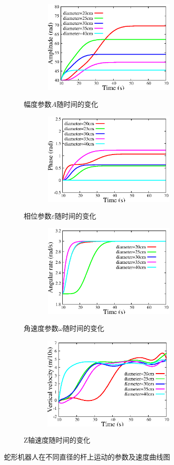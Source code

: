 \begin{figure}[htbp]
	\centering
	\begin{subfigure}{0.45\textwidth}{
		\centering
		\includegraphics[width=1\textwidth,height=130pt]{figure/chap05/samplifier.eps}
		\label{fig:samplifier}
		\caption{幅度参数$A$随时间的变化}
	}
	\end{subfigure}
	\begin{subfigure}{0.45\textwidth}{
		\centering
		\includegraphics[width=1\textwidth,height=130pt]{figure/chap05/sphase.eps}
		\label{fig:sphase}
		\caption{相位参数$\varepsilon$随时间的变化}
	}
	\end{subfigure}
	\begin{subfigure}{0.45\textwidth}{
		\centering
		\includegraphics[width=1\textwidth,height=130pt]{figure/chap05/sarate.eps}
		\label{fig:sarate}
		\caption{角速度参数$\omega$随时间的变化}
	}
	\end{subfigure}
	\begin{subfigure}{0.45\textwidth}{
		\centering
		\includegraphics[width=1\textwidth,height=130pt]{figure/chap05/svel.eps}
		\label{fig:svelocity}
		\caption{Z轴速度随时间的变化}
	}
	\end{subfigure}
	\caption{蛇形机器人在不同直径的杆上运动的参数及速度曲线图}
	\label{fig:scurve}
\end{figure}


